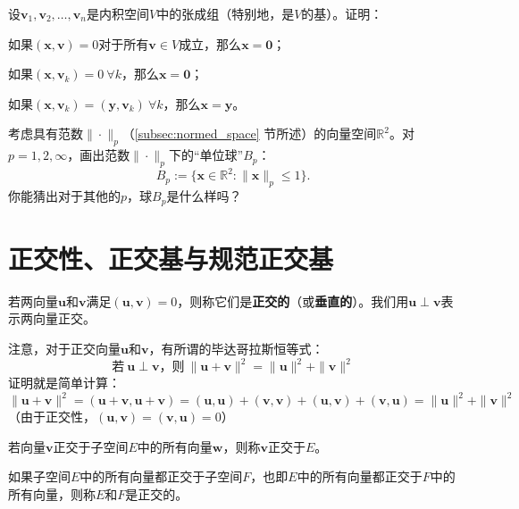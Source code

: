 \begin{problemset}
    \item 设$\mathbf{v}_{1},\mathbf{v}_{2},\ldots,\mathbf{v}_{n}$是内积空间$V$中的张成组（特别地，是$V$的基）。证明：
    \begin{probenumerate}
        \item 如果$(\mathbf{x},\mathbf{v})=0$对于所有$\mathbf{v}\in V$成立，那么$\mathbf{x}=\mathbf{0}$；
        \item 如果$(\mathbf{x},\mathbf{v}_k)=0\ \forall k$，那么$\mathbf{x}=\mathbf{0}$；
        \item 如果$(\mathbf{x},\mathbf{v}_k)=(\mathbf{y},\mathbf{v}_k)\ \forall k$，那么$\mathbf{x}=\mathbf{y}$。
    \end{probenumerate}
    \item 考虑具有范数$\|\cdot\|_p$（\ref{subsec:normed_space} 节所述）的向量空间$\mathbb{R}^2$。对$p=1,2,\infty$，画出范数$\|\cdot\|_p$下的“单位球”$B_p$：
    \[B_p:=\{\mathbf{x}\in\mathbb{R}^2:\|\mathbf{x}\|_p\leq1\}.\]
    你能猜出对于其他的$p$，球$B_p$是什么样吗？
\end{problemset}

\section{正交性、正交基与规范正交基}

\begin{definition}
    若两向量$\mathbf{u}$和$\mathbf{v}$满足$(\mathbf{u},\mathbf{v})=0$，则称它们是{\bf 正交的}（或{\bf 垂直的}）。我们用$\mathbf{u}\perp \mathbf{v}$表示两向量正交。
\end{definition}

注意，对于正交向量$\mathbf{u}$和$\mathbf{v}$，有所谓的毕达哥拉斯恒等式：
\[\text{若}~\mathbf{u}\perp\mathbf{v}\text{，则}~\|\mathbf{u}+\mathbf{v}\|^2=\|\mathbf{u}\|^2+\|\mathbf{v}\|^2\]
证明就是简单计算：\[\|\mathbf{u}+\mathbf{v}\|^2=(\mathbf{u}+\mathbf{v},\mathbf{u}+\mathbf{v})=(\mathbf{u},\mathbf{u})+(\mathbf{v},\mathbf{v})+(\mathbf{u},\mathbf{v})+(\mathbf{v},\mathbf{u})=\|\mathbf{u}\|^2+\|\mathbf{v}\|^2\]
（由于正交性，$(\mathbf{u},\mathbf{v})=(\mathbf{v},\mathbf{u})=0$）

\begin{definition}
    若向量$\mathbf{v}$正交于子空间$E$中的所有向量$\mathbf{w}$，则称$\mathbf{v}$正交于$E$。

    如果子空间$E$中的所有向量都正交于子空间$F$，也即$E$中的所有向量都正交于$F$中的所有向量，则称$E$和$F$是正交的。
\end{definition}

